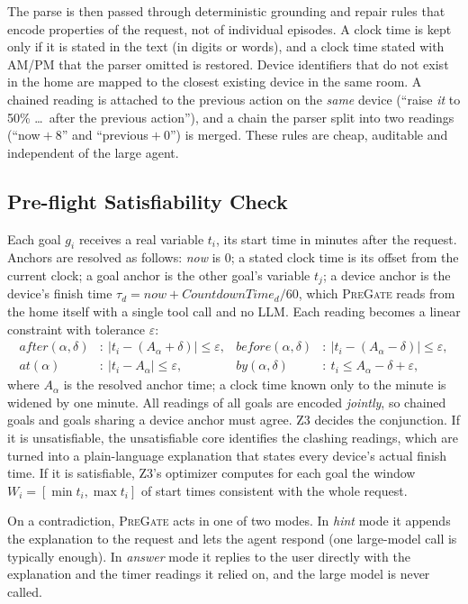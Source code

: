 \documentclass[sigconf]{aamas}
\newcommand{\sys}{\textsc{PreGate}}
\begin{document}
The parse is then passed through deterministic grounding and repair rules that encode properties of the
request, not of individual episodes. A clock time is kept only if it is stated in the text (in digits or words),
and a clock time stated with AM/PM that the parser omitted is restored. Device identifiers that do not exist in
the home are mapped to the closest existing device in the same room. A chained reading is attached to the
previous action on the \emph{same} device (``raise \emph{it} to 50\% \dots\ after the previous action''), and a
chain the parser split into two readings (``now${}+8$'' and ``previous${}+0$'') is merged. These rules are
cheap, auditable and independent of the large agent.

\subsection{Pre-flight Satisfiability Check}

Each goal $g_i$ receives a real variable $t_i$, its start time in minutes after the request. Anchors are
resolved as follows: \textit{now} is $0$; a stated clock time is its offset from the current clock; a goal anchor
is the other goal's variable $t_j$; a device anchor is the device's finish time
$\tau_d = \mathit{now} + \mathit{CountdownTime}_d/60$, which \sys{} reads from the home itself with a single tool
call and no LLM. Each reading becomes a linear constraint with tolerance $\varepsilon$:
\begin{align*}
\textit{after}(\alpha,\delta)&:\ |t_i - (A_\alpha + \delta)| \le \varepsilon, &
\textit{before}(\alpha,\delta)&:\ |t_i - (A_\alpha - \delta)| \le \varepsilon,\\
\textit{at}(\alpha)&:\ |t_i - A_\alpha| \le \varepsilon, &
\textit{by}(\alpha,\delta)&:\ t_i \le A_\alpha - \delta + \varepsilon,
\end{align*}
where $A_\alpha$ is the resolved anchor time; a clock time known only to the minute is widened by one minute.
All readings of all goals are encoded \emph{jointly}, so chained goals and goals sharing a device anchor must
agree. Z3 decides the conjunction. If it is unsatisfiable, the unsatisfiable core identifies the clashing
readings, which are turned into a plain-language explanation that states every device's actual finish time.
If it is satisfiable, Z3's optimizer computes for each goal the window $W_i=[\min t_i,\max t_i]$ of start times
consistent with the whole request.

On a contradiction, \sys{} acts in one of two modes. In \emph{hint} mode it appends the explanation to the request
and lets the agent respond (one large-model call is typically enough). In \emph{answer} mode it replies to the
user directly with the explanation and the timer readings it relied on, and the large model is never called.
\end{document}
